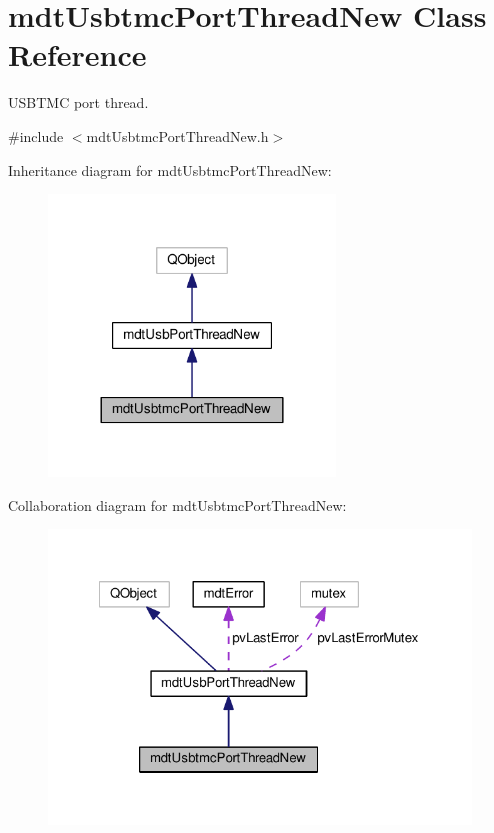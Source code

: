 \hypertarget{classmdt_usbtmc_port_thread_new}{\section{mdt\-Usbtmc\-Port\-Thread\-New Class Reference}
\label{classmdt_usbtmc_port_thread_new}
}


U\-S\-B\-T\-M\-C port thread.  




{\ttfamily \#include $<$mdt\-Usbtmc\-Port\-Thread\-New.\-h$>$}



Inheritance diagram for mdt\-Usbtmc\-Port\-Thread\-New\-:\nopagebreak
\begin{figure}[H]
\begin{center}
\leavevmode
\includegraphics[width=216pt]{classmdt_usbtmc_port_thread_new__inherit__graph}
\end{center}
\end{figure}


Collaboration diagram for mdt\-Usbtmc\-Port\-Thread\-New\-:\nopagebreak
\begin{figure}[H]
\begin{center}
\leavevmode
\includegraphics[width=324pt]{classmdt_usbtmc_port_thread_new__coll__graph}
\end{center}
\end{figure}
